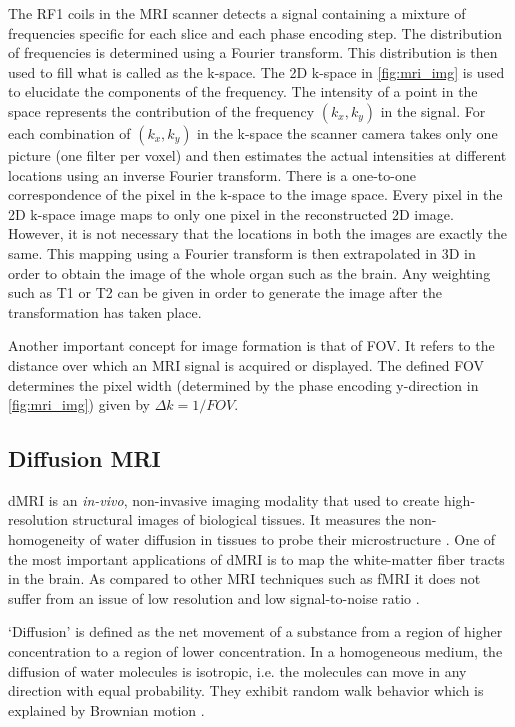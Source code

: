\documentclass[msthesis.tex]{subfiles}
\begin{document}
The \gls{RF1} coils in the \gls{MRI} scanner detects a signal containing a mixture of frequencies specific for each slice and each phase encoding step. The distribution of frequencies is determined using a Fourier transform. This distribution is then used to fill what is called as the k-space. The 2D k-space in \autoref{fig:mri_img} is used to elucidate the components of the frequency. The intensity of a point in the space represents the contribution of the frequency $(k_x,k_y)$ in the signal. For each combination of $(k_x, k_y)$ in the k-space the scanner camera takes only one picture (one filter per voxel) and then estimates the actual intensities at different locations using an inverse Fourier transform. There is a one-to-one correspondence of the pixel in the k-space to the image space. Every pixel in the 2D k-space image maps to only one pixel in the reconstructed 2D image. However, it is not necessary that the locations in both the images are exactly the same. This mapping using a Fourier transform is then extrapolated in 3D in order to obtain the image of the whole organ such as the brain. Any weighting such as T1 or T2 can be given in order to generate the image after the transformation has taken place.

Another important concept for image formation is that of \gls{FOV}. It refers to the distance over which an \gls{MRI} signal is acquired or displayed. The defined \gls{FOV} determines the pixel width (determined by the phase encoding y-direction in \autoref{fig:mri_img}) given by $\Delta k = 1/FOV$. 

\subsection{Diffusion MRI}

\gls{dMRI} is an \textit{in-vivo}, non-invasive imaging modality that used to create high-resolution structural images of biological tissues. It measures the non-homogeneity of water diffusion in tissues to probe their microstructure \citep{ghosh2015survey}. One of the most important applications of \gls{dMRI} is to map the white-matter fiber tracts in the brain. As compared to other \gls{MRI} techniques such as \gls{fMRI} it does not suffer from an issue of low resolution and low signal-to-noise ratio \citep{wong2016}. 

`Diffusion' is defined as the net movement of a substance from a region of higher concentration to a region of lower concentration. In a homogeneous medium, the diffusion of water molecules is isotropic, i.e. the molecules can move in any direction with equal probability. They exhibit random walk behavior which is explained by Brownian motion \citep{Brogioli_2000}.
\end{document}
